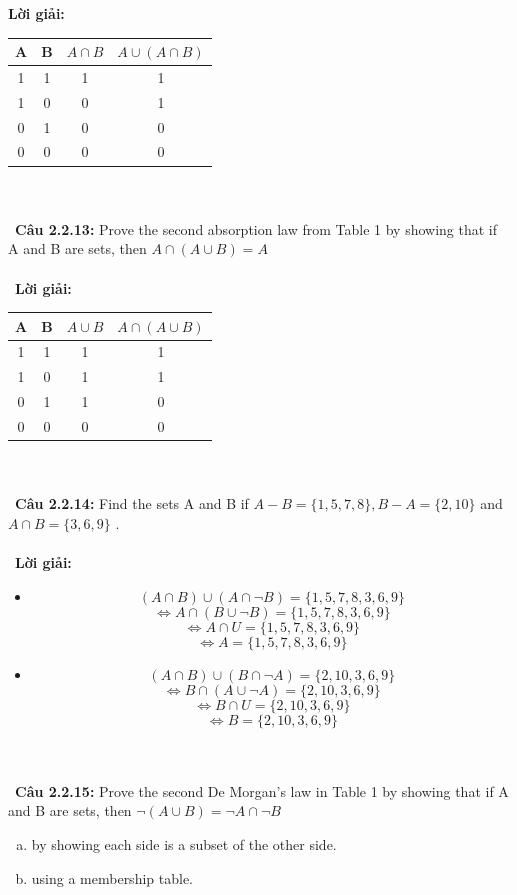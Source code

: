 \documentclass[a4paper]{article}
\begin{document}
\textbf{Lời giải:} \begin{tabular}{|c|c|c|c|}
\hline 
A & B & $A \cap B$ & $A \cup (A \cap B)$ \\ 
\hline 
1 & 1 & 1 & 1 \\ 
\hline 
1 & 0 & 0 & 1 \\ 
\hline 
0 & 1 & 0 & 0 \\ 
\hline 
0 & 0 & 0 & 0 \\ 
\hline 
\end{tabular}  \\\ \\\
\textbf{Câu 2.2.13: } Prove the second absorption law from Table 1 by showing that if A and B are sets, then $A \cap (A \cup B)=A$  \\\ \\\
\textbf{Lời giải:} \begin{tabular}{|c|c|c|c|}
\hline 
A & B & $A \cup B$ & $A \cap (A \cup B)$ \\ 
\hline 
1 & 1 & 1 & 1 \\ 
\hline 
1 & 0 & 1 & 1 \\ 
\hline 
0 & 1 & 1 & 0 \\ 
\hline 
0 & 0 & 0 & 0 \\ 
\hline 
\end{tabular}  \\\ \\\
\textbf{Câu 2.2.14: } Find the sets A and B if $A-B=\{1,5,7,8\}, B-A=\{2,10\}$ and $A \cap B =\{3,6,9\}$ . \\\ \\\
\textbf{Lời giải:} \begin{itemize}
\item $$(A \cap B) \cup (A \cap \lnot B)=\{1,5,7,8,3,6,9\}$$
$$\Leftrightarrow A \cap (B \cup \lnot B)=\{1,5,7,8,3,6,9\}$$
$$\Leftrightarrow A \cap U=\{1,5,7,8,3,6,9\}$$
$$\Leftrightarrow A =\{1,5,7,8,3,6,9\}$$
\item $$(A \cap B) \cup (B \cap \lnot A)=\{2,10,3,6,9\}$$
$$\Leftrightarrow B \cap (A \cup \lnot A)=\{2,10,3,6,9\}$$
$$\Leftrightarrow B \cap U=\{2,10,3,6,9\}$$
$$\Leftrightarrow B =\{2,10,3,6,9\}$$
\end{itemize}
 \\\ \\\
\textbf{Câu 2.2.15: } Prove the second De Morgan's law in Table 1 by showing that if A and B are sets, then $\lnot (A \cup B)=\lnot A \cap \lnot B$
\begin{enumerate}[a)]
\item by showing each side is a subset of the other side.
\item using a membership table.
\end{enumerate} \\\ \\\
\end{document}
